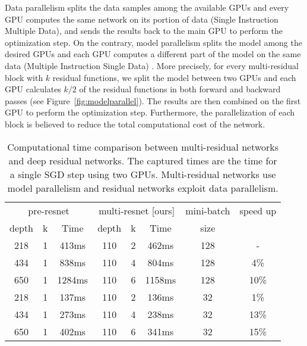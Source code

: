 \documentclass[journal]{IEEEtran}
\begin{document}
Data parallelism splits the data samples among the available GPUs and every GPU computes the same network on its portion of data (Single Instruction Multiple Data), and sends the results back to the main GPU to perform the optimization step. On the contrary, model parallelism splits the model among the desired GPUs and each GPU computes a different part of the model on the same data (Multiple Instruction Single Data)  \cite{dean2012large,krizhevsky2014one}. More precisely, for every multi-residual block with $k$ residual functions, we split the model between two GPUs and each GPU calculates $k/2$ of the residual functions in both forward and backward passes (see Figure~\ref{fig:modelparallel}). The results are then combined on the first GPU to perform the optimization step. Furthermore, the parallelization of each block is believed to reduce the total computational cost of the network. 




\begin{table*}[!htb]
\centering
\begin{tabular}{||c c c|| c c c ||c ||c||} 
\hline
\multicolumn{3}{||c||}{pre-resnet \cite{he2016identity}} &
\multicolumn{3}{c||}{multi-resnet [ours]} &
\multicolumn{1}{c||}{ mini-batch  } &
\multicolumn{1}{c||}{ speed up } \\

\cline{1-6}
depth & k & Time  &depth & k & Time & size & \\  
\hline
\hline

218 & 1& 413ms & 110 & 2& 462ms &128 & -\\ 

434 & 1& 838ms & 110 & 4& 804ms &128 & 4\%\\ 

650 & 1& 1284ms & 110 & 6& 1158ms &128 & 10\%\\ 
 

\hline

218 & 1& 137ms & 110 & 2& 136ms &32 & 1\%\\ 

434 & 1& 273ms & 110 & 4& 238ms &32 & 13\%\\ 

650 & 1& 402ms & 110 & 6& 341ms &32 & 15\%\\ 
 

\hline

\end{tabular}
\caption{Computational time comparison between multi-residual networks and deep residual networks. The captured times are the time for a single SGD step using two GPUs. Multi-residual networks use model parallelism and residual networks exploit data parallelism.}
\label{table:5}
\end{table*}
\end{document}
